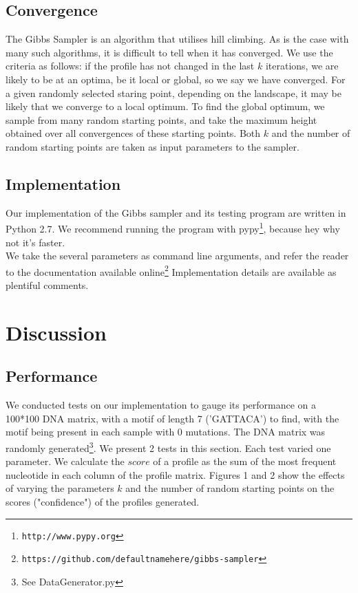 \documentclass{bioinfo}
\begin{document}
\begin{methods}
\subsection{Convergence}
The Gibbs Sampler is an algorithm that utilises hill climbing. As is the case with many such algorithms, it is difficult to tell when it has converged. We use the criteria as follows: if the profile has not changed in the last $k$ iterations, we are likely to be at an optima, be it local or global, so we say we have converged. For a given randomly selected staring point, depending on the landscape, it may be likely that we converge to a local optimum. To find the global optimum, we sample from many random starting points, and take the maximum height obtained over all convergences of these starting points. Both $k$ and the number of random starting points are taken as input parameters to the sampler.

\subsection{Implementation}
Our implementation of the Gibbs sampler and its testing program are written in Python 2.7. We recommend running the program with pypy\footnote{\texttt{http://www.pypy.org}}, because hey why not it's faster. \\
We take the several parameters as command line arguments, and refer the reader to the documentation available online\footnote{\texttt{https://github.com/defaultnamehere/gibbs-sampler}}
Implementation details are available as plentiful comments.
\end{methods}


\section{Discussion}
\subsection{Performance}
We conducted tests on our implementation to gauge its performance on a 100*100 DNA matrix, with a motif of length 7 ('GATTACA') to find, with the motif being present in each sample with 0 mutations. The DNA matrix was randomly generated\footnote{See DataGenerator.py}. We present 2 tests in this section. Each test varied one parameter. We calculate the $score$ of a profile as the sum of the most frequent nucleotide in each column of the profile matrix. Figures 1 and 2 show the effects of varying the parameters $k$ and the number of random starting points on the scores ("confidence") of the profiles generated.
\end{document}
